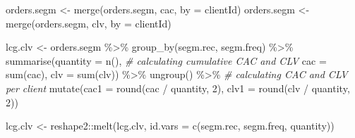 \documentclass[
]{book}
\newenvironment{Shaded}{\begin{snugshade}}{\end{snugshade}}
\newcommand{\AttributeTok}[1]{\textcolor[rgb]{0.77,0.63,0.00}{#1}}
\newcommand{\CommentTok}[1]{\textcolor[rgb]{0.56,0.35,0.01}{\textit{#1}}}
\newcommand{\DecValTok}[1]{\textcolor[rgb]{0.00,0.00,0.81}{#1}}
\newcommand{\FunctionTok}[1]{\textcolor[rgb]{0.00,0.00,0.00}{#1}}
\newcommand{\NormalTok}[1]{#1}
\newcommand{\OtherTok}[1]{\textcolor[rgb]{0.56,0.35,0.01}{#1}}
\newcommand{\SpecialCharTok}[1]{\textcolor[rgb]{0.00,0.00,0.00}{#1}}
\newcommand{\StringTok}[1]{\textcolor[rgb]{0.31,0.60,0.02}{#1}}
\begin{document}
\begin{Shaded}
\begin{Highlighting}[]
\NormalTok{orders.segm }\OtherTok{\textless{}{-}} \FunctionTok{merge}\NormalTok{(orders.segm, cac, }\AttributeTok{by =} \StringTok{\textquotesingle{}clientId\textquotesingle{}}\NormalTok{)}
\NormalTok{orders.segm }\OtherTok{\textless{}{-}} \FunctionTok{merge}\NormalTok{(orders.segm, clv, }\AttributeTok{by =} \StringTok{\textquotesingle{}clientId\textquotesingle{}}\NormalTok{)}

\NormalTok{lcg.clv }\OtherTok{\textless{}{-}}\NormalTok{ orders.segm }\SpecialCharTok{\%\textgreater{}\%}
    \FunctionTok{group\_by}\NormalTok{(segm.rec, segm.freq) }\SpecialCharTok{\%\textgreater{}\%}
    \FunctionTok{summarise}\NormalTok{(}\AttributeTok{quantity =} \FunctionTok{n}\NormalTok{(),}
              \CommentTok{\# calculating cumulative CAC and CLV}
              \AttributeTok{cac =} \FunctionTok{sum}\NormalTok{(cac),}
              \AttributeTok{clv =} \FunctionTok{sum}\NormalTok{(clv)) }\SpecialCharTok{\%\textgreater{}\%}
    \FunctionTok{ungroup}\NormalTok{() }\SpecialCharTok{\%\textgreater{}\%}
    \CommentTok{\# calculating CAC and CLV per client}
    \FunctionTok{mutate}\NormalTok{(}\AttributeTok{cac1 =} \FunctionTok{round}\NormalTok{(cac }\SpecialCharTok{/}\NormalTok{ quantity, }\DecValTok{2}\NormalTok{),}
           \AttributeTok{clv1 =} \FunctionTok{round}\NormalTok{(clv }\SpecialCharTok{/}\NormalTok{ quantity, }\DecValTok{2}\NormalTok{))}

\NormalTok{lcg.clv }\OtherTok{\textless{}{-}}
\NormalTok{    reshape2}\SpecialCharTok{::}\FunctionTok{melt}\NormalTok{(lcg.clv, }\AttributeTok{id.vars =} \FunctionTok{c}\NormalTok{(}\StringTok{\textquotesingle{}segm.rec\textquotesingle{}}\NormalTok{, }\StringTok{\textquotesingle{}segm.freq\textquotesingle{}}\NormalTok{, }\StringTok{\textquotesingle{}quantity\textquotesingle{}}\NormalTok{))}


\end{Highlighting}
\end{Shaded}
\end{document}
